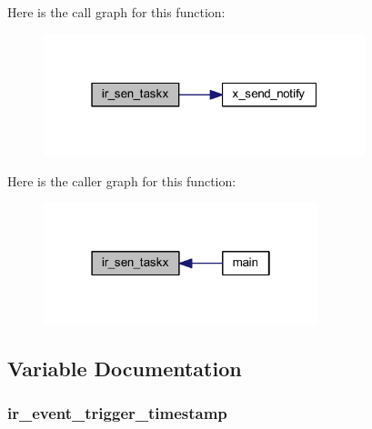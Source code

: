 Here is the call graph for this function\+:\nopagebreak
\begin{figure}[H]
\begin{center}
\leavevmode
\includegraphics[width=265pt]{d4/d51/a00017_a24529100c87dfc257e9b56f7f0bcfa78_cgraph}
\end{center}
\end{figure}




Here is the caller graph for this function\+:\nopagebreak
\begin{figure}[H]
\begin{center}
\leavevmode
\includegraphics[width=226pt]{d4/d51/a00017_a24529100c87dfc257e9b56f7f0bcfa78_icgraph}
\end{center}
\end{figure}




\subsection{Variable Documentation}
\hypertarget{a00017_a6951f534a479b17c02d7da3ad6489634}{
\subsubsection[{ir\+\_\+event\+\_\+trigger\+\_\+timestamp}]{ ir\+\_\+event\+\_\+trigger\+\_\+timestamp}}\label{a00017_a6951f534a479b17c02d7da3ad6489634}


